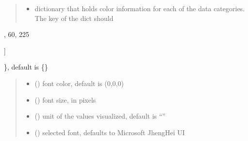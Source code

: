 \documentclass[letterpaper,10pt,english]{sphinxmanual}
\begin{document}
\begin{fulllineitems}
\begin{quote}
\begin{description}
\begin{itemize}
\item {} 
\sphinxAtStartPar
{} \textendash{} dictionary that holds color information for each of the data categories. The key of the dict should

\end{itemize}

\end{description}\end{quote}
\begin{description}
\begin{description}
\sphinxlineitem{\{}\begin{description}
\sphinxlineitem{“United States”: {[}}
,
60,
225

\end{description}

\sphinxAtStartPar
{]}

\end{description}

\sphinxAtStartPar
\}, default is \{\}

\end{description}
\begin{quote}\begin{description}
\begin{itemize}
\item {} 
\sphinxAtStartPar
{} () \textendash{} font color, default is (0,0,0)

\item {} 
\sphinxAtStartPar
{} () \textendash{} font size, in pixels

\item {} 
\sphinxAtStartPar
{} () \textendash{} unit of the values visualized, default is “”

\item {} 
\sphinxAtStartPar
{} () \textendash{} selected font, defaults to Microsoft JhengHei UI


\end{itemize}
\end{description}
\end{quote}
\end{fulllineitems}
\end{document}
